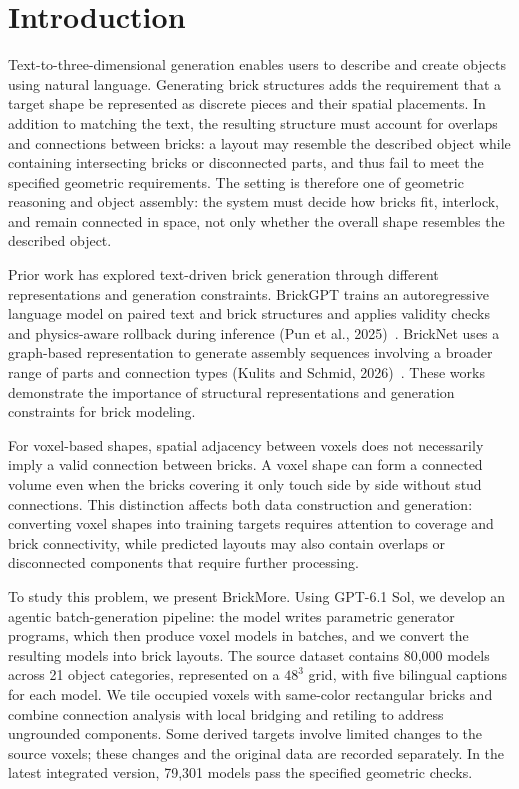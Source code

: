 \documentclass[10pt,twocolumn,letterpaper]{article}
\begin{document}
\section{Introduction}
Text-to-three-dimensional generation enables users to describe and create objects using natural language. Generating brick structures adds the requirement that a target shape be represented as discrete pieces and their spatial placements. In addition to matching the text, the resulting structure must account for overlaps and connections between bricks: a layout may resemble the described object while containing intersecting bricks or disconnected parts, and thus fail to meet the specified geometric requirements. The setting is therefore one of geometric reasoning and object assembly: the system must decide how bricks fit, interlock, and remain connected in space, not only whether the overall shape resembles the described object.

Prior work has explored text-driven brick generation through different representations and generation constraints. BrickGPT trains an autoregressive language model on paired text and brick structures and applies validity checks and physics-aware rollback during inference (Pun et al., 2025)~\cite{brickgpt}. BrickNet uses a graph-based representation to generate assembly sequences involving a broader range of parts and connection types (Kulits and Schmid, 2026)~\cite{bricknet}. These works demonstrate the importance of structural representations and generation constraints for brick modeling.

For voxel-based shapes, spatial adjacency between voxels does not necessarily imply a valid connection between bricks. A voxel shape can form a connected volume even when the bricks covering it only touch side by side without stud connections. This distinction affects both data construction and generation: converting voxel shapes into training targets requires attention to coverage and brick connectivity, while predicted layouts may also contain overlaps or disconnected components that require further processing.

To study this problem, we present BrickMore. Using GPT-6.1 Sol, we develop an agentic batch-generation pipeline: the model writes parametric generator programs, which then produce voxel models in batches, and we convert the resulting models into brick layouts. The source dataset contains 80,000 models across 21 object categories, represented on a $48^3$ grid, with five bilingual captions for each model. We tile occupied voxels with same-color rectangular bricks and combine connection analysis with local bridging and retiling to address ungrounded components. Some derived targets involve limited changes to the source voxels; these changes and the original data are recorded separately. In the latest integrated version, 79,301 models pass the specified geometric checks.
\end{document}

